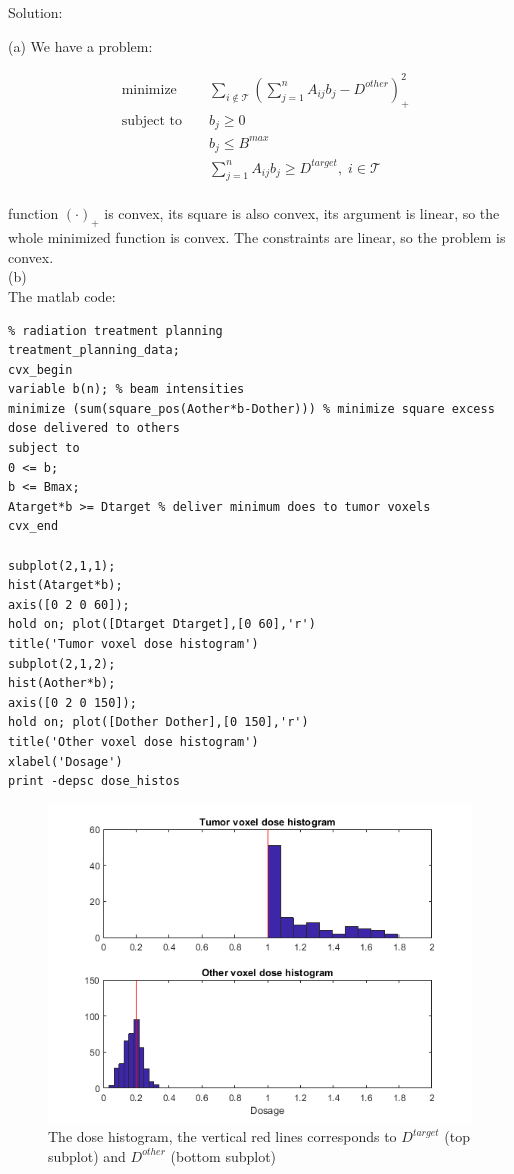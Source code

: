\documentclass{article}
\begin{document}
Solution:

(a) We have a problem:

\begin{align*}
	&\text{minimize } && \sum_{i \notin \mathcal{T}}(
	\sum_{j = 1}^{n} A_{ij}b_j - D^{other})_+^2\\
	&\text{subject to } && b_j \geq 0\\
	& && b_j \leq B^{max} \\
	& && \sum_{j = 1}^{n} A_{ij}b_j \geq D^{target}, 
	\; i \in  \mathcal{T} \\
\end{align*} 

function $(\cdot)_+$ is convex, its 
square is also convex, its argument is linear, so the whole minimized function is convex. The constraints are linear, so the problem is convex.\\

(b) \\
The matlab code:
\begin{verbatim}
% radiation treatment planning
treatment_planning_data;
cvx_begin
variable b(n); % beam intensities
minimize (sum(square_pos(Aother*b-Dother))) % minimize square excess dose delivered to others
subject to 
0 <= b;
b <= Bmax;
Atarget*b >= Dtarget % deliver minimum does to tumor voxels
cvx_end

subplot(2,1,1);
hist(Atarget*b);
axis([0 2 0 60]);
hold on; plot([Dtarget Dtarget],[0 60],'r')
title('Tumor voxel dose histogram')
subplot(2,1,2);
hist(Aother*b);
axis([0 2 0 150]);
hold on; plot([Dother Dother],[0 150],'r')
title('Other voxel dose histogram')
xlabel('Dosage')
print -depsc dose_histos	
\end{verbatim}	

\begin{figure}[H]
	\includegraphics[width=\linewidth]{A_18_2_plot.png}
	\caption{The dose histogram, the vertical red lines corresponds to $D^{target}$ (top subplot) and $D^{other}$ (bottom subplot)}
	\label{fig:A_18_2_plot}
\end{figure}
\end{document}
